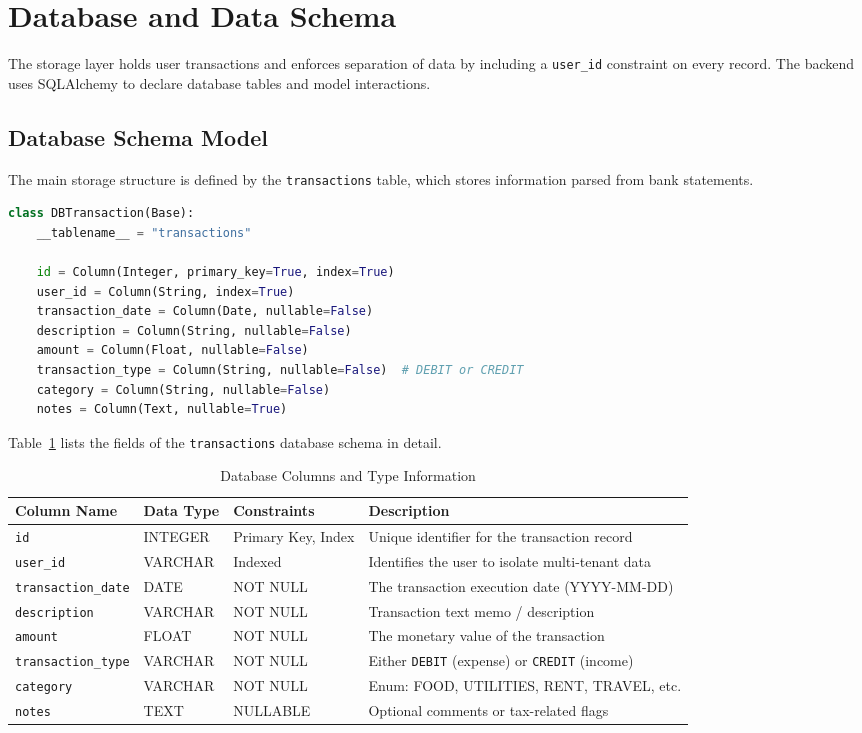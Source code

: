 \documentclass[11pt,a4paper]{article}
\begin{document}
\section{Database and Data Schema}
The storage layer holds user transactions and enforces separation of data by including a \texttt{user\_id} constraint on every record. The backend uses SQLAlchemy to declare database tables and model interactions.

\subsection{Database Schema Model}
The main storage structure is defined by the \texttt{transactions} table, which stores information parsed from bank statements. 

\begin{lstlisting}[language=Python, caption=SQLAlchemy Transaction Model (database.py)]
class DBTransaction(Base):
    __tablename__ = "transactions"

    id = Column(Integer, primary_key=True, index=True)
    user_id = Column(String, index=True)
    transaction_date = Column(Date, nullable=False)
    description = Column(String, nullable=False)
    amount = Column(Float, nullable=False)
    transaction_type = Column(String, nullable=False)  # DEBIT or CREDIT
    category = Column(String, nullable=False)
    notes = Column(Text, nullable=True)
\end{lstlisting}

Table~\ref{tab:schema} lists the fields of the \texttt{transactions} database schema in detail.

\begin{table}[htbp]
\centering
\begin{tabular}{llll}
\toprule
\textbf{Column Name} & \textbf{Data Type} & \textbf{Constraints} & \textbf{Description} \\
\midrule
\texttt{id} & INTEGER & Primary Key, Index & Unique identifier for the transaction record \\
\texttt{user\_id} & VARCHAR & Indexed & Identifies the user to isolate multi-tenant data \\
\texttt{transaction\_date} & DATE & NOT NULL & The transaction execution date (YYYY-MM-DD) \\
\texttt{description} & VARCHAR & NOT NULL & Transaction text memo / description \\
\texttt{amount} & FLOAT & NOT NULL & The monetary value of the transaction \\
\texttt{transaction\_type} & VARCHAR & NOT NULL & Either \texttt{DEBIT} (expense) or \texttt{CREDIT} (income) \\
\texttt{category} & VARCHAR & NOT NULL & Enum: FOOD, UTILITIES, RENT, TRAVEL, etc. \\
\texttt{notes} & TEXT & NULLABLE & Optional comments or tax-related flags \\
\bottomrule
\end{tabular}
\caption{Database Columns and Type Information}
\label{tab:schema}
\end{table}
\end{document}
